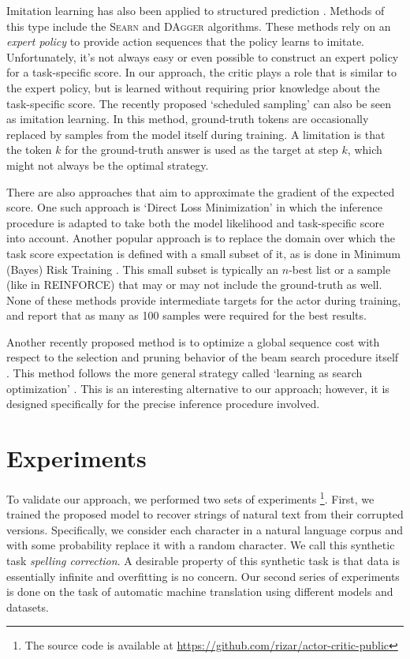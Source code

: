 \documentclass{article} \usepackage{iclr2017_conference,times}
\begin{document}
Imitation learning has also been
applied to structured prediction \citep{vlachos2012investigation}.
Methods of this type include the \textsc{Searn} \citep{daume2009search}
and \textsc{DAgger} \citep{ross2010reduction} algorithms.
These methods rely on an 
\emph{expert policy} to provide action sequences that the policy
learns to imitate. Unfortunately, it's not always easy or even
possible to construct an expert policy for a task-specific score. 
In our approach, the critic plays a role that is similar to the
expert policy, but is learned without requiring
prior knowledge about the task-specific score.
The recently proposed `scheduled sampling'
\citep{bengio2015scheduled} can also be seen as imitation learning.
In this method, ground-truth tokens are occasionally replaced by
samples from the model itself during training. A limitation
is that the token $k$ for the ground-truth answer is used as the target at 
step $k$, which might not always be the optimal strategy.

There are also approaches that aim to approximate the gradient of the
expected score. One such approach is
`Direct Loss Minimization' \citep{hazan2010} in which the
inference procedure is adapted to take both the model likelihood and
task-specific score into account.
Another popular approach is to replace the domain over which the task score expectation is
defined with a small subset of it, as is done in Minimum (Bayes) Risk
Training \citep{goel2000minimum,shen2015minimum,och2003minimum}.
This small subset is typically an $n$-best list or a sample (like in REINFORCE) that may or may not include
the ground-truth as well.
None of these methods provide intermediate targets for the actor during
training, and \citet{shen2015minimum} report that as many as 100 samples
were required for the best results.

Another recently proposed method is to optimize a global sequence
cost with respect to the selection and pruning behavior of the beam search procedure itself
\citep{wiseman2016sequence}. This method follows the more general strategy
called `learning as search optimization' \citep{daume2005learning}. This is an
interesting alternative to our approach; however, it is designed
specifically for the precise inference procedure involved.


\section{Experiments}

To validate our approach, we performed two sets of experiments \footnote{
The source code is available at \url{https://github.com/rizar/actor-critic-public}}.
First, we trained
the proposed model to recover strings of natural text from their corrupted versions.
Specifically, we consider each character in a natural language corpus
and with some probability replace it with a random
character. We call this synthetic task
 \textit{spelling correction}.
A desirable property of this synthetic task
is that data is essentially infinite and overfitting is no concern. 
Our second series of experiments is done on the task of automatic machine translation
using different models and datasets.
\end{document}
